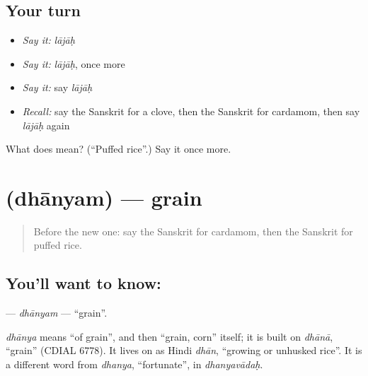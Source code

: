 \subsection*{Your turn}
\begin{itemize}
\raggedright
  \item \emph{Say it:} \emph{lājāḥ}
  \item \emph{Say it:} \emph{lājāḥ}, once more
  \item \emph{Say it:} say \emph{lājāḥ}
  \item \emph{Recall:} say the Sanskrit for a clove, then the Sanskrit for cardamom, then say \emph{lājāḥ} again
\end{itemize}

\begin{tcolorbox}[breakable,colback=teal!4,colframe=teal!35!black,title={Before you move on}]
What does  mean? (\textquotedblleft{}Puffed rice\textquotedblright{}.) Say it once more.
\end{tcolorbox}
\section[\texorpdfstring{\sk{धान्यम्} (dhānyam)}{धान्यम् (dhānyam)}]{ (dhānyam) — grain}

\label{lesson:SA-C246-dhanyam}



\begin{quote}
Before the new one: say the Sanskrit for cardamom, then the Sanskrit for puffed rice.
\end{quote}

\subsection*{You'll want to know: }
\textbf{} — \emph{dhānyam} — \textquotedblleft{}grain\textquotedblright{}.

\begin{cousinweb}
\emph{dhānya} means \textquotedblleft{}of grain\textquotedblright{}, and then \textquotedblleft{}grain, corn\textquotedblright{} itself; it is built on \emph{dhānā}, \textquotedblleft{}grain\textquotedblright{} (CDIAL 6778). It lives on as Hindi \emph{dhān}, \textquotedblleft{}growing or unhusked rice\textquotedblright{}. It is a different word from \emph{dhanya}, \textquotedblleft{}fortunate\textquotedblright{}, in \emph{dhanyavādaḥ}.
\end{cousinweb}

